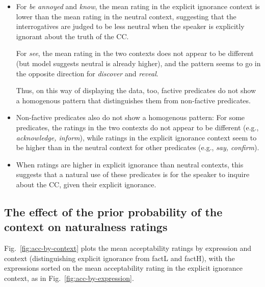 \documentclass[11pt,fleqn]{article}
\newcommand{\6}{\mbox{$[\hspace*{-.6mm}[$}}
\newcommand{\9}{\mbox{$]\hspace*{-.6mm}]$}}
\begin{document}
\begin{itemize}

\item For {\em be annoyed} and {\em know}, the mean rating in the explicit ignorance context is lower than the mean rating in the neutral context, suggesting that the interrogatives are judged to be less neutral when the speaker is explicitly ignorant about the truth of the CC. 

For {\em see}, the mean rating in the two contexts does not appear to be different (but model suggests neutral is already higher), and the pattern seems to go in the opposite direction for {\em discover} and {\em reveal}. 

Thus, on this way of displaying the data, too, factive predicates do not show a homogenous pattern that distinguishes them from non-factive predicates.

\item Non-factive predicates also do not show a homogenous pattern: For some predicates, the ratings in the two contexts do not appear to be different (e.g., {\em acknowledge, inform}), while ratings in the explicit ignorance context seem to be higher than in the neutral context for other predicates (e.g., {\em say, confirm}).

\item When ratings are higher in explicit ignorance than neutral contexts, this suggests that a natural use of these predicates is for the speaker to inquire about the CC, given their explicit ignorance.

\end{itemize}

\subsection{The effect of the prior probability of the context on naturalness ratings}

Fig.~\ref{fig:acc-by-context} plots the mean acceptability ratings by expression and context (distinguishing explicit ignorance from factL and factH), with the expressions sorted on the mean acceptability rating in the explicit ignorance context, as in Fig.~\ref{fig:acc-by-expression}.
\end{document}
